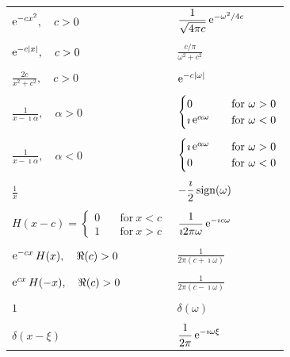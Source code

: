 \begin{longtable}{ll}
  $\displaystyle \mathop{\mathrm{e}}\nolimits^{-c x^2}, \quad c > 0$
  & $\displaystyle \frac{1}{\sqrt{4 \pi c}} \mathop{\mathrm{e}}\nolimits^{-\omega^2/4c}$ \\
  \\
  $\displaystyle \mathop{\mathrm{e}}\nolimits^{-c |x|}, \quad c > 0$
  & $\displaystyle \frac{c / \pi}{\omega^2 + c^2}$ \\
  \\
  $\displaystyle \frac{2 c}{x^2 + c^2}, \quad c > 0$
  & $\displaystyle \mathop{\mathrm{e}}\nolimits^{-c |\omega|}$ \\
  \\
  $\displaystyle \frac{1}{x - \imath \alpha}, \quad \alpha > 0$
  & $\displaystyle \begin{cases}
    0 \quad &\mathrm{for}\ \omega > 0 \\
    \imath \mathop{\mathrm{e}}\nolimits^{\alpha \omega} \quad &\mathrm{for}\ \omega < 0
  \end{cases}$ \\
  \\
  $\displaystyle \frac{1}{x - \imath \alpha}, \quad \alpha < 0$
  & $\displaystyle \begin{cases}
    \imath \mathop{\mathrm{e}}\nolimits^{\alpha \omega} \quad &\mathrm{for}\ \omega > 0 \\
    0 \quad &\mathrm{for}\  \omega < 0
  \end{cases}$ \\
  \\
  $\displaystyle \frac{1}{x}$
  & $\displaystyle -\frac{\imath}{2} \mathop{\mathrm{sign}}\nolimits(\omega)$ \\
  \\
  $\displaystyle H(x - c) = \begin{cases}
    0 \quad &\mathrm{for}\ x < c \\
    1 \quad &\mathrm{for}\ x > c
  \end{cases}$
  & $\displaystyle \frac{1}{\imath 2 \pi \omega} \mathop{\mathrm{e}}\nolimits^{- \imath c \omega}$ \\
  \\
  $\displaystyle \mathop{\mathrm{e}}\nolimits^{- c x} H(x),\quad \Re(c) > 0$
  & $\displaystyle \frac{ 1 }{ 2 \pi (c + \imath \omega) }$ \\
  \\
  $\displaystyle \mathop{\mathrm{e}}\nolimits^{c x} H(- x),\quad \Re(c) > 0$
  & $\displaystyle \frac{ 1 }{ 2 \pi (c - \imath \omega) }$ \\
  \\
  $\displaystyle 1$
  & $\displaystyle \delta(\omega)$ \\
  \\
  $\displaystyle \delta(x - \xi)$
  & $\displaystyle \frac{1}{2 \pi} \mathop{\mathrm{e}}\nolimits^{- \imath \omega \xi}$ \\

\end{longtable}
